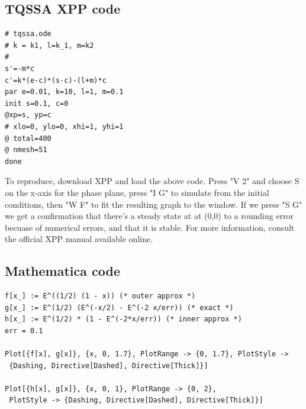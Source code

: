 \documentclass[12pt]{article}
\begin{document}
\subsection{TQSSA XPP code}
\begin{verbatim}
# tqssa.ode
# k = k1, l=k_1, m=k2
#
s'=-m*c
c'=k*(e-c)*(s-c)-(l+m)*c
par e=0.01, k=10, l=1, m=0.1
init s=0.1, c=0
@xp=s, yp=c
# xlo=0, ylo=0, xhi=1, yhi=1
@ total=400
@ nmesh=51
done
\end{verbatim}

To reproduce, download XPP and load the above code. Press "V 2" and
choose S on the x-axis for the phase plane, press "I G" to simulate
from the initial conditions, then "W F" to fit the resulting graph to
the window. If we press "S G" we get a confirmation that there's a
steady state at at (0,0) to a rounding error becuase of numerical
errors, and that it is stable. For more information, consult the
official XPP manual available online.

\subsection{Mathematica code}
\begin{verbatim}
f[x_] := E^((1/2) (1 - x)) (* outer approx *)
g[x_] := E^(1/2) (E^(-x/2) - E^(-2 x/err)) (* exact *)
h[x_] := E^(1/2) * (1 - E^(-2*x/err)) (* inner approx *)
err = 0.1

Plot[{f[x], g[x]}, {x, 0, 1.7}, PlotRange -> {0, 1.7}, PlotStyle ->
 {Dashing, Directive[Dashed], Directive[Thick]}]

Plot[{h[x], g[x]}, {x, 0, 1}, PlotRange -> {0, 2}, 
 PlotStyle -> {Dashing, Directive[Dashed], Directive[Thick]}]
\end{verbatim}

\newpage

\end{document}
